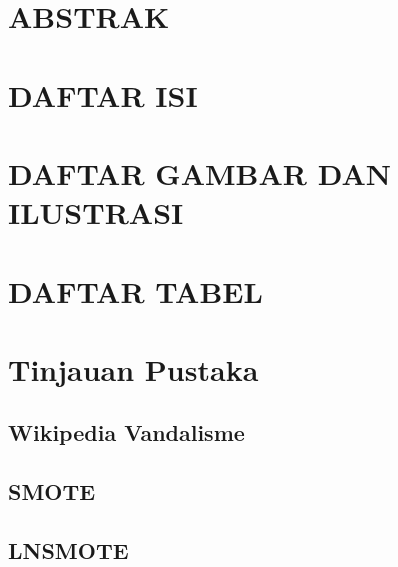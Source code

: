 

\renewcommand{\listfigurename}{}
\renewcommand{\listtablename}{}





\newpage
{}
\chapter*{ABSTRAK}\label{chapter:abstrak}


\newpage
\chapter*{DAFTAR ISI}\label{chapter:daftar_isi}
\tableofcontents

\newpage
\chapter*{DAFTAR GAMBAR DAN ILUSTRASI}
\listoffigures

\newpage
\chapter*{DAFTAR TABEL}
\listoftables

\newpage
{}



\chapter{Tinjauan Pustaka}

\section{Wikipedia Vandalisme}


\section{SMOTE}


\section{LNSMOTE}



